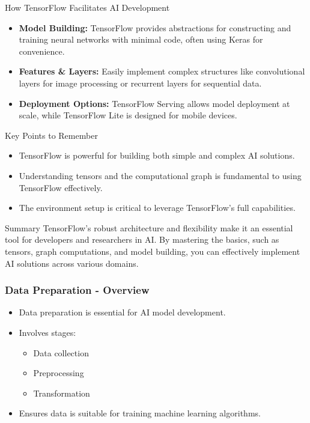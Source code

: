 \documentclass[aspectratio=169]{beamer}
\begin{document}
\begin{frame}{How TensorFlow Facilitates AI Development}
    \begin{itemize}
        \item \textbf{Model Building:} 
        TensorFlow provides abstractions for constructing and training neural networks with minimal code, often using Keras for convenience.
        
        \item \textbf{Features \& Layers:} 
        Easily implement complex structures like convolutional layers for image processing or recurrent layers for sequential data.
        
        \item \textbf{Deployment Options:} 
        TensorFlow Serving allows model deployment at scale, while TensorFlow Lite is designed for mobile devices.
    \end{itemize}
\end{frame}

\begin{frame}{Key Points to Remember}
    \begin{itemize}
        \item TensorFlow is powerful for building both simple and complex AI solutions.
        \item Understanding tensors and the computational graph is fundamental to using TensorFlow effectively.
        \item The environment setup is critical to leverage TensorFlow’s full capabilities.
    \end{itemize}
\end{frame}

\begin{frame}{Summary}
    TensorFlow's robust architecture and flexibility make it an essential tool for developers and researchers in AI. 
    By mastering the basics, such as tensors, graph computations, and model building, you can effectively implement AI solutions across various domains.
\end{frame}

\begin{frame}[fragile]
    \frametitle{Data Preparation - Overview}
    \begin{itemize}
        \item Data preparation is essential for AI model development.
        \item Involves stages: 
        \begin{itemize}
            \item Data collection
            \item Preprocessing
            \item Transformation
        \end{itemize}
        \item Ensures data is suitable for training machine learning algorithms.
    \end{itemize}
\end{frame}
\end{document}
